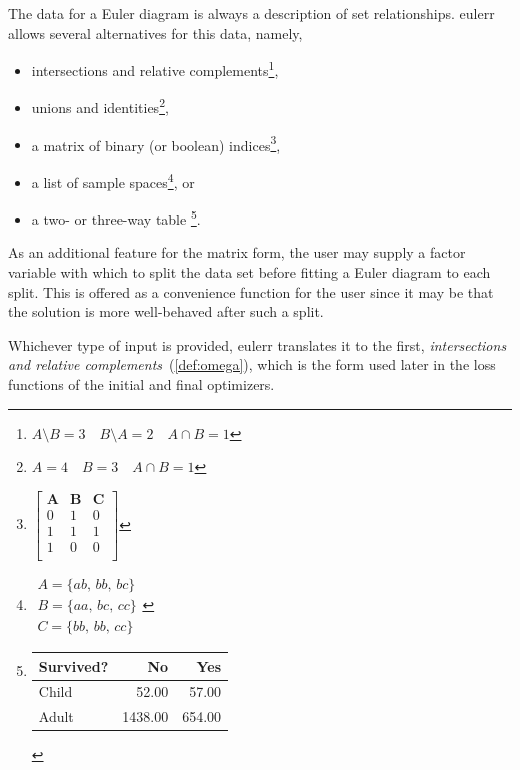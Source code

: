 \documentclass[
  oneside,
  openany,
  numbers=noendperiod,
  parskip=half,
  bibliography=totoc
]{scrbook}\usepackage[]{graphicx}\usepackage{xcolor}
\newcommand{\pkg}[1]{{\fontseries{b}\selectfont #1}}
\begin{document}
The data for a Euler diagram is always a description of set relationships.
\pkg{eulerr} allows several alternatives for this data, namely,
\begin{itemize}
\item intersections and relative complements\footnote{%
    $A \setminus B = 3 \quad B \setminus A = 2 \quad A \cap B=1$
  },
\item unions and identities\footnote{%
    $A=4 \quad B=3 \quad A \cap B=1$
  },
\item a matrix of binary (or boolean) indices\footnote{%
    $\begin{bmatrix}
      \bm{A} & \bm{B} & \bm{C}\\
      0 & 1 & 0 \\
      1 & 1 & 1 \\
      1 & 0 & 0 \\
    \end{bmatrix}$
  },
\item a list of sample spaces\footnote{%
    $\begin{matrix}
      A = \{ab,\,bb,\,bc\}\\
      B = \{aa,\,bc,\,cc\}\\
      C = \{bb,\,bb,\,cc\} \end{matrix}
    $
  }, or
\item a two- or three-way table \footnote{%
    \begin{tabular}{lrr}
    \toprule Survived? & No  & Yes \\
    \midrule Child & 52.00 & 57.00 \\
    Adult & 1438.00 & 654.00 \\
    \bottomrule\end{tabular}
  }.
\end{itemize}

As an additional feature for the matrix form, the user may supply a factor
variable with which to split the data set before fitting a Euler diagram to each
split. This is offered as a convenience function for the user since it may be
that the solution is more well-behaved after such a split.

Whichever type of input is provided, \pkg{eulerr} translates it to the first,
\emph{intersections and relative complements}~(\cref{def:omega}), which is the
form used later in the loss functions of the initial and final optimizers.
\end{document}
